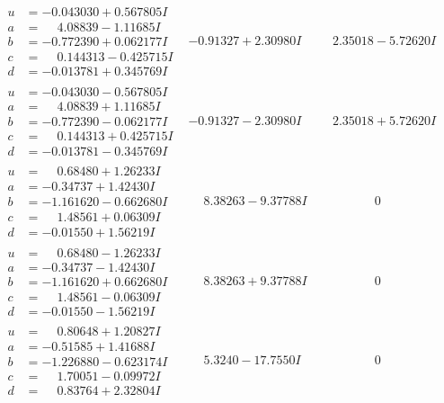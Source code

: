 \documentclass[1p]{elsarticle_modified}
\theoremstyle{definition}
\begin{document}
$$\begin{array}{c|c|c}
\begin{aligned}
u &= -0.043030 + 0.567805 I \\
a &= \phantom{-}4.08839 - 1.11685 I \\
b &= -0.772390 + 0.062177 I \\
c &= \phantom{-}0.144313 - 0.425715 I \\
d &= -0.013781 + 0.345769 I\end{aligned}
 & -0.91327 + 2.30980 I & \phantom{-}2.35018 - 5.72620 I \\ \hline\begin{aligned}
u &= -0.043030 - 0.567805 I \\
a &= \phantom{-}4.08839 + 1.11685 I \\
b &= -0.772390 - 0.062177 I \\
c &= \phantom{-}0.144313 + 0.425715 I \\
d &= -0.013781 - 0.345769 I\end{aligned}
 & -0.91327 - 2.30980 I & \phantom{-}2.35018 + 5.72620 I \\ \hline\begin{aligned}
u &= \phantom{-}0.68480 + 1.26233 I \\
a &= -0.34737 + 1.42430 I \\
b &= -1.161620 - 0.662680 I \\
c &= \phantom{-}1.48561 + 0.06309 I \\
d &= -0.01550 + 1.56219 I\end{aligned}
 & \phantom{-}8.38263 - 9.37788 I & \phantom{-0.000000 } 0 \\ \hline\begin{aligned}
u &= \phantom{-}0.68480 - 1.26233 I \\
a &= -0.34737 - 1.42430 I \\
b &= -1.161620 + 0.662680 I \\
c &= \phantom{-}1.48561 - 0.06309 I \\
d &= -0.01550 - 1.56219 I\end{aligned}
 & \phantom{-}8.38263 + 9.37788 I & \phantom{-0.000000 } 0 \\ \hline\begin{aligned}
u &= \phantom{-}0.80648 + 1.20827 I \\
a &= -0.51585 + 1.41688 I \\
b &= -1.226880 - 0.623174 I \\
c &= \phantom{-}1.70051 - 0.09972 I \\
d &= \phantom{-}0.83764 + 2.32804 I\end{aligned}
 & \phantom{-}5.3240 - 17.7550 I & \phantom{-0.000000 } 0 \\ \hline\begin{aligned}

\end{aligned}
\end{array}$$
\end{document}
